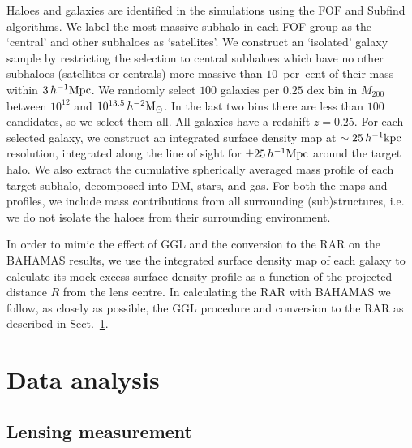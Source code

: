 \documentclass[usenatbib]{mnras}
\newcommand{\hmsun}{\,h^{-2} {\rm M_\odot}}
\newcommand{\hkpc}{\, h^{-1}{\rm{kpc}} }
\newcommand{\hMpc}{\, h^{-1}{\rm{Mpc}} }
\begin{document}
Haloes and galaxies are identified in the simulations using the FOF \citep{davis1985} and Subfind \citep{springel2001a,dolag2009} algorithms. We label the most massive subhalo in each FOF group as the `central' and other subhaloes as `satellites'. We construct an `isolated' galaxy sample by restricting the selection to central subhaloes which have no other subhaloes (satellites or centrals) more massive than $10$~per~cent of their mass within $3 \hMpc$. We randomly select $100$ galaxies per $0.25$ dex bin in $M_{200}$ between $10^{12}$ and $10^{13.5} \hmsun$. In the last two bins there are less than $100$ candidates, so we select them all. All galaxies have a redshift $z=0.25$. For each selected galaxy, we construct an integrated surface density map at $\sim 25\hkpc$ resolution, integrated along the line of sight for $\pm 25\hMpc$ around the target halo. We also extract the cumulative spherically averaged mass profile of each target subhalo, decomposed into DM, stars, and gas. For both the maps and profiles, we include mass contributions from all surrounding (sub)structures, i.e. we do not isolate the haloes from their surrounding environment.

In order to mimic the effect of GGL and the conversion to the RAR on the BAHAMAS results, we use the integrated surface density map of each galaxy to calculate its mock excess surface density profile as a function of the projected distance $R$ from the lens centre. In calculating the RAR with BAHAMAS we follow, as closely as possible, the GGL procedure and conversion to the RAR as described in Sect.~\ref{sec:analysis}.

\section{Data analysis}
\label{sec:analysis}

\subsection{Lensing measurement}
\label{sec:lensing}
\end{document}
